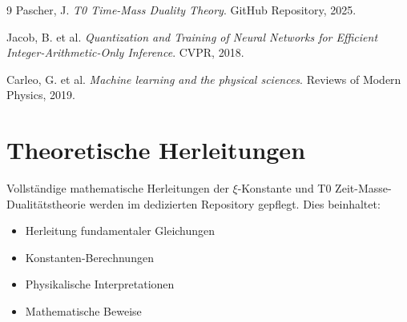 	\begin{thebibliography}{9}
		Pascher, J. \textit{T0 Time-Mass Duality Theory}. 
		GitHub Repository, 2025.
		
		Jacob, B. et al. \textit{Quantization and Training of Neural Networks for Efficient Integer-Arithmetic-Only Inference}. 
		CVPR, 2018.
		
		Carleo, G. et al. \textit{Machine learning and the physical sciences}. 
		Reviews of Modern Physics, 2019.
	\end{thebibliography}
	
	\appendix
	\section{Theoretische Herleitungen}
	
	Vollständige mathematische Herleitungen der $\xi$-Konstante und T0 Zeit-Masse-Dualitätstheorie werden im dedizierten Repository gepflegt. Dies beinhaltet:
	
	\begin{itemize}
		\item Herleitung fundamentaler Gleichungen
		\item Konstanten-Berechnungen
		\item Physikalische Interpretationen
		\item Mathematische Beweise
	\end{itemize}
	
